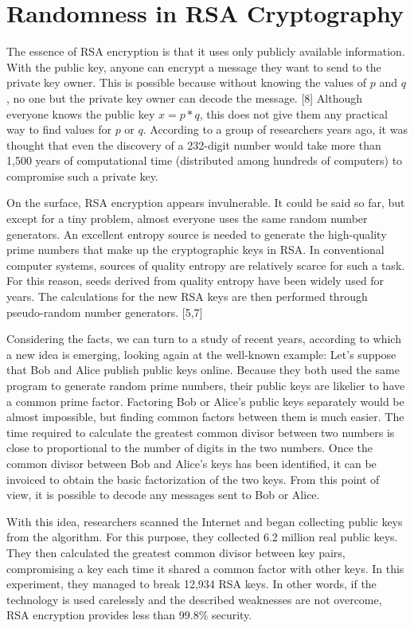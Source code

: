 \documentclass[runningheads]{llncs}
\begin{document}
\section{Randomness in RSA Cryptography}
\label{sec:3}

The essence of RSA encryption is that it uses only publicly available information. With the public key, anyone can encrypt a message they want to send to the private key owner. This is possible because without knowing the values of $p$ and $q$, no one but the private key owner can decode the message. [8] Although everyone knows the public key $x = p * q$, this does not give them any practical way to find values for $p$ or $q$. According to a group of researchers years ago, it was thought that even the discovery of a 232-digit number would take more than 1,500 years of computational time (distributed among hundreds of computers) to compromise such a private key. 

On the surface, RSA encryption appears invulnerable. It could be said so far, but except for a tiny problem, almost everyone uses the same random number generators. An excellent entropy source is needed to generate the high-quality prime numbers that make up the cryptographic keys in RSA. In conventional computer systems, sources of quality entropy are relatively scarce for such a task. For this reason, seeds derived from quality entropy have been widely used for years. The calculations for the new RSA keys are then performed through pseudo-random number generators. [5,7]

Considering the facts, we can turn to a study of recent years, according to which a new idea is emerging, looking again at the well-known example: Let's suppose that Bob and Alice publish public keys online. Because they both used the same program to generate random prime numbers, their public keys are likelier to have a common prime factor. Factoring Bob or Alice's public keys separately would be almost impossible, but finding common factors between them is much easier. The time required to calculate the greatest common divisor between two numbers is close to proportional to the number of digits in the two numbers. Once the common divisor between Bob and Alice's keys has been identified, it can be invoiced to obtain the basic factorization of the two keys. From this point of view, it is possible to decode any messages sent to Bob or Alice.

With this idea, researchers scanned the Internet and began collecting public keys from the algorithm. For this purpose, they collected 6.2 million real public keys. They then calculated the greatest common divisor between key pairs, compromising a key each time it shared a common factor with other keys. In this experiment, they managed to break 12,934 RSA keys. In other words, if the technology is used carelessly and the described weaknesses are not overcome, RSA encryption provides less than 99.8\% security. 
\end{document}
